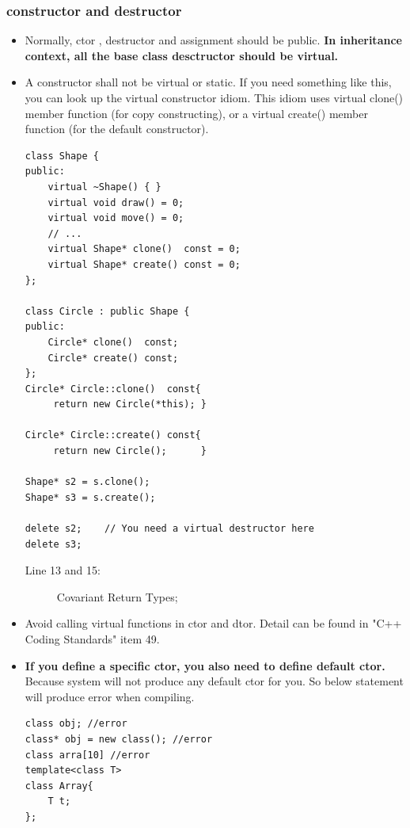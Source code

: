 \documentclass[a4paper,11pt,twoside]{book}
\begin{document}
\subsubsection{constructor and destructor}
\begin{itemize}

	\item Normally, ctor , destructor and assignment should be public. \textbf{In inheritance context, all the base class desctructor should be virtual. }
	
	\item A constructor shall not be virtual or static. If you need something like this, you can look up the virtual constructor idiom. This idiom uses virtual clone() member function (for copy constructing), or a virtual create() member function (for the default constructor).
	
\begin{lstlisting}
class Shape {
public:
	virtual ~Shape() { }                 
	virtual void draw() = 0;           
	virtual void move() = 0;
	// ...
	virtual Shape* clone()  const = 0;   
	virtual Shape* create() const = 0; 
};

class Circle : public Shape {
public:
	Circle* clone()  const;  
	Circle* create() const;   
};
Circle* Circle::clone()  const{
	 return new Circle(*this); }
	 
Circle* Circle::create() const{
	 return new Circle();      }

Shape* s2 = s.clone();
Shape* s3 = s.create();

delete s2;    // You need a virtual destructor here
delete s3;
\end{lstlisting}
\begin{description}
	\item[Line 13 and 15:] Covariant Return Types; 
\end{description}
	
	\item Avoid calling virtual functions in ctor and dtor. Detail can be found in "C++ Coding Standards" item 49.
	
	\item \textbf{If you define a specific ctor, you also need to define default ctor.} Because system will not produce any default ctor for you. So below statement will produce error when compiling.
\begin{lstlisting}[numbers=none]
class obj; //error
class* obj = new class(); //error
class arra[10] //error
template<class T>
class Array{
	T t;
};
	

\end{lstlisting}
\end{itemize}
\end{document}
